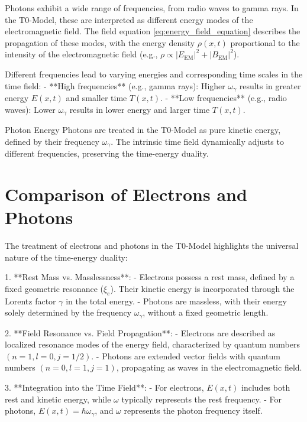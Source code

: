 \documentclass[12pt,a4paper]{article}
\begin{document}
	Photons exhibit a wide range of frequencies, from radio waves to gamma rays. In the T0-Model, these are interpreted as different energy modes of the electromagnetic field. The field equation \eqref{eq:energy_field_equation} describes the propagation of these modes, with the energy density \(\rho(x,t)\) proportional to the intensity of the electromagnetic field (e.g., \( \rho \propto |E_{\text{EM}}|^2 + |B_{\text{EM}}|^2 \)).
	
	Different frequencies lead to varying energies and corresponding time scales in the time field:
	- **High frequencies** (e.g., gamma rays): Higher \(\omega_\gamma\) results in greater energy \( E(x,t) \) and smaller time \( T(x,t) \).
	- **Low frequencies** (e.g., radio waves): Lower \(\omega_\gamma\) results in lower energy and larger time \( T(x,t) \).
	
	\begin{important}{Photon Energy}{}
		Photons are treated in the T0-Model as pure kinetic energy, defined by their frequency \(\omega_\gamma\). The intrinsic time field dynamically adjusts to different frequencies, preserving the time-energy duality.
	\end{important}
	
	\section{Comparison of Electrons and Photons}
	\label{sec:comparison}
	
	The treatment of electrons and photons in the T0-Model highlights the universal nature of the time-energy duality:
	
	1. **Rest Mass vs. Masslessness**:
	- Electrons possess a rest mass, defined by a fixed geometric resonance (\(\xi_e\)). Their kinetic energy is incorporated through the Lorentz factor \(\gamma\) in the total energy.
	- Photons are massless, with their energy solely determined by the frequency \(\omega_\gamma\), without a fixed geometric length.
	
	2. **Field Resonance vs. Field Propagation**:
	- Electrons are described as localized resonance modes of the energy field, characterized by quantum numbers \((n=1, l=0, j=1/2)\).
	- Photons are extended vector fields with quantum numbers \((n=0, l=1, j=1)\), propagating as waves in the electromagnetic field.
	
	3. **Integration into the Time Field**:
	- For electrons, \( E(x,t) \) includes both rest and kinetic energy, while \(\omega\) typically represents the rest frequency.
	- For photons, \( E(x,t) = \hbar \omega_\gamma \), and \(\omega\) represents the photon frequency itself.
	
\end{document}
